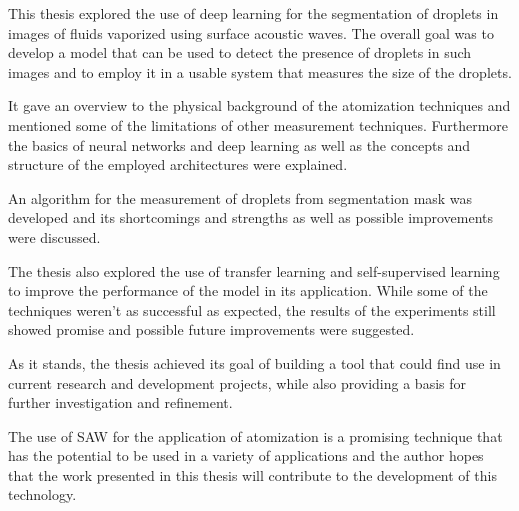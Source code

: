 This thesis explored the use of deep learning for the segmentation of droplets in images of fluids vaporized using surface acoustic waves.
The overall goal was to develop a model that can be used to detect the presence of droplets in such images and to employ it in a usable system that measures the size of the droplets.

It gave an overview to the physical background of the atomization techniques and mentioned some of the limitations of other measurement techniques.
Furthermore the basics of neural networks and deep learning as well as the concepts and structure of the employed architectures were explained.

An algorithm for the measurement of droplets from segmentation mask was developed and its shortcomings and strengths as well as possible improvements were discussed.

The thesis also explored the use of transfer learning and self-supervised learning to improve the performance of the model in its application.
While some of the techniques weren't as successful as expected, the results of the experiments still showed promise and possible future improvements were suggested.

As it stands, the thesis achieved its goal of building a tool that could find use in current research and development projects, while also providing a basis for further investigation and refinement.

The use of SAW for the application of atomization is a promising technique that has the potential to be used in a variety of applications and the author hopes that the work presented in this thesis will contribute to the development of this technology.